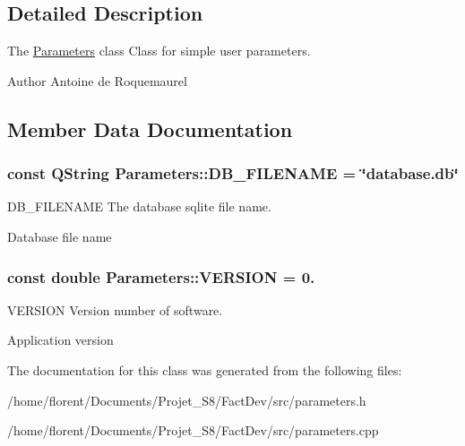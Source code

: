 \subsection{Detailed Description}
The \hyperlink{classParameters}{Parameters} class Class for simple user parameters. 

\begin{DoxyAuthor}{Author}
Antoine de Roquemaurel 
\end{DoxyAuthor}


\subsection{Member Data Documentation}
\hypertarget{classParameters_a80b98bd51d910bcc2203afcacbc7df87}{
\subsubsection[{D\-B\-\_\-\-F\-I\-L\-E\-N\-A\-M\-E}]{\setlength{\rightskip}{0pt plus 5cm}const Q\-String Parameters\-::\-D\-B\-\_\-\-F\-I\-L\-E\-N\-A\-M\-E = \char`\"{}database.\-db\char`\"{}\hspace{0.3cm}{\ttfamily [static]}}}\label{classParameters_a80b98bd51d910bcc2203afcacbc7df87}


D\-B\-\_\-\-F\-I\-L\-E\-N\-A\-M\-E The database sqlite file name. 

Database file name \hypertarget{classParameters_a279ee24140c761de46178daa8960bdc8}{
\subsubsection[{V\-E\-R\-S\-I\-O\-N}]{\setlength{\rightskip}{0pt plus 5cm}const double Parameters\-::\-V\-E\-R\-S\-I\-O\-N = 0.\hspace{0.3cm}{\ttfamily [static]}}}\label{classParameters_a279ee24140c761de46178daa8960bdc8}


V\-E\-R\-S\-I\-O\-N Version number of software. 

Application version 

The documentation for this class was generated from the following files\-:\begin{DoxyCompactItemize}
\item 
/home/florent/\-Documents/\-Projet\-\_\-\-S8/\-Fact\-Dev/src/parameters.\-h\item 
/home/florent/\-Documents/\-Projet\-\_\-\-S8/\-Fact\-Dev/src/parameters.\-cpp\end{DoxyCompactItemize}
